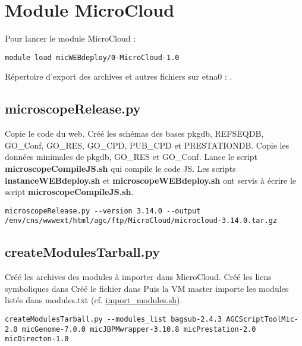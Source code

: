\section {Module MicroCloud}

Pour lancer le module MicroCloud :
\begin{lstlisting}[style=bash]
module load micWEBdeploy/0-MicroCloud-1.0
\end{lstlisting}

Répertoire d'export des archives et autres fichiers sur etna0 : .

\subsection{microscopeRelease.py}
Copie le code du web.
\newline
Créé les schémas des bases pkgdb, REFSEQDB, GO\_Conf, GO\_RES, GO\_CPD, PUB\_CPD et PRESTATIONDB.
\newline
Copie les données minimales de pkgdb, GO\_RES et GO\_Conf.
\newline
Lance le script \textbf{microscopeCompileJS.sh} qui compile le code JS. Les scripts \textbf{instanceWEBdeploy.sh} et \textbf{microscopeWEBdeploy.sh} ont servis à écrire le script \textbf{microscopeCompileJS.sh}.

\begin{lstlisting}[style=bash]
microscopeRelease.py --version 3.14.0 --output /env/cns/wwwext/html/agc/ftp/MicroCloud/microcloud-3.14.0.tar.gz
\end{lstlisting}

\subsection{createModulesTarball.py}
Créé les archives des modules à importer dans MicroCloud.
\newline
Créé les liens symboliques dans 
\newline
Créé le fichier  dans 
\newline
Puis la VM master importe les modules listés dans modules.txt (cf. \href{https://github.com/IFB-ElixirFr/biosphere-microcloud/blob/master/master/import_modules.sh}{import\_modules.sh}).

\begin{lstlisting}[style=bash]
createModulesTarball.py --modules_list bagsub-2.4.3 AGCScriptToolMic-2.0 micGenome-7.0.0 micJBPMwrapper-3.10.8 micPrestation-2.0 micDirecton-1.0
\end{lstlisting}
\bigskip

